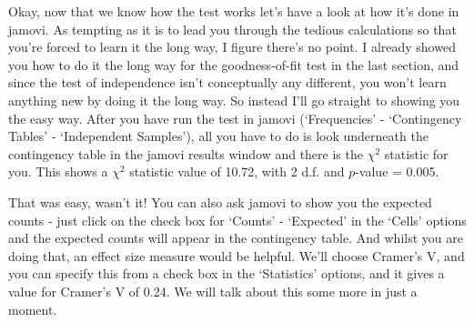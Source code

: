 
Okay, now that we know how the test works let's have a look at how it's done in jamovi. As tempting as it is to lead you through the tedious calculations so that you're forced to learn it the long way, I figure there's no point. I already showed you how to do it the long way for the goodness-of-fit test in the last section, and since the test of independence isn't conceptually any different, you won't learn anything new by doing it the long way. So instead I'll go straight to showing you the easy way. After you have run the test in jamovi (‘Frequencies’ - ‘Contingency Tables’ - ‘Independent Samples’), all you have to do is look underneath the contingency table in the jamovi results window and there is the $\chi^2$ statistic for you. This shows a $\chi^2$ statistic value of 10.72, with 2 d.f. and $p$-value = 0.005. 

That was easy, wasn't it! You can also ask jamovi to show you the expected counts - just click on the check box for `Counts' - `Expected' in the `Cells' options and the expected counts will appear in the contingency table. And whilst you are doing that, an effect size measure would be helpful. We'll choose Cramer's V, and you can specify this from a check box in the `Statistics' options, and it gives a value for Cramer's V of 0.24. We will talk about this some more in just a moment.

